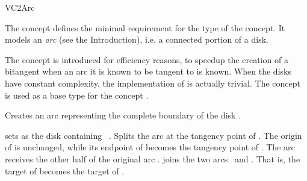 
\ccRefPageBegin


\begin{ccRefConcept}{VC2Arc}

\ccDefinition

The \ccRefName{} concept defines the minimal requirement for the 
type of the  concept. It models an \emph{arc} (see the
Introduction), i.e. a connected portion of a disk.

The \ccRefName{} concept is introduced for efficiency reasons, to speedup
the creation of a bitangent when an arc it is known to be tangent to is
known. When the disks have constant complexity, the implementation of
\ccRefName{} is actually trivial. The  concept is used as a
base type for the concept .
  
\ccTypes
{}
\ccThreeToTwo



\ccThreeToTwo
\ccCreation
{}

\ccGlue
{}
{Creates an arc representing the complete boundary of the disk .}

\ccAccessFunctions
{}

\ccOperations
{}
\ccTagFullDeclarations
{}
{sets  as the disk containing \ccVar\ .}
\ccGlue
{} {Splits the arc
\ccVar{} at the tangency point of . The origin of \ccVar{} is
unchanged, while its endpoint of \ccVar{} becomes the tangency point of
. The arc  receives the other half of the original arc
\ccVar{}.}
\ccGlue
{}
{joins the two arcs \ccVar\ and . That is, the target of \ccVar
becomes the target of .}


\end{ccRefConcept}
